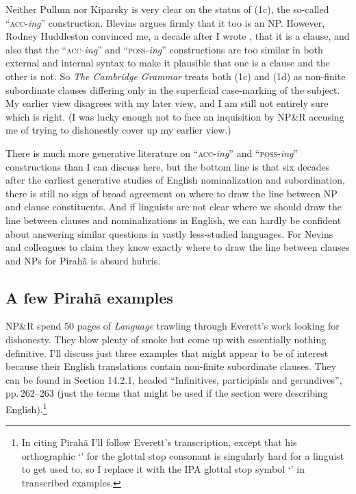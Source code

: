 \documentclass[output=paper,colorlinks,citecolor=brown
]{langscibook}
\begin{document}
Neither Pullum nor Kiparsky is very clear on the status of (1c), the
so-called ``\textsc{acc}-\textit{ing}'' construction. Blevins argues
firmly that it too is an NP. However, Rodney Huddleston convinced me,
a decade after I wrote \citet{Pullum91}, that it is a clause, and also
that the ``\textsc{acc}-\textit{ing}'' and ``\textsc{poss}-\textit{ing}''
constructions are too similar in both external and internal syntax
to make it plausible that one is a clause and the other is not.
So \textit{The Cambridge Grammar} treats both (1c) and (1d) as
non-finite subordinate clauses differing only in the superficial
case-marking of the subject. My earlier view disagrees with my later
view, and I am still not entirely sure which is right. (I was
lucky enough not to face an inquisition by NP\&R accusing me of
trying to dishonestly cover up my earlier view.)

There is much more generative literature on ``\textsc{acc}-\textit{ing}''
and ``\textsc{poss}-\textit{ing}'' constructions than I can discuss here,
but the bottom line is that six decades after the earliest generative
studies of English nominalization and subordination, there is still
no sign of broad agreement on where to draw the line between NP and
clause constituents.  And if linguists are not clear where we should
draw the line between clauses and nominalizations in English, we can
hardly be confident about answering similar questions in vastly
less-studied languages. For Nevins and colleagues to claim they know
exactly where to draw the line between clauses and NPs for Pirah{\~a}
is absurd hubris.

\subsection{A few Pirah{\~a} examples}

NP\&R spend 50 pages of \textit{Language} trawling through Everett's
work looking for dishonesty. They blow plenty of smoke but come up
with essentially nothing definitive. I'll discuss just three examples
that might appear to be of interest because their English translations
contain non-finite subordinate clauses. They can be found in
\citet{Everett86HAL} Section 14.2.1, headed ``Infinitives, participials
and gerundives'', pp.\,262--263 (just the terms that might be used if
the section were describing English).\footnote{\label{transcription}
   In citing Pirah{\~a} I'll follow Everett's transcription, except
   that his orthographic `' for the glottal stop consonant is
   singularly hard for a linguist to get used to, so I replace it with the
   IPA glottal stop symbol `{\textglotstop}' in transcribed examples.}
\end{document}
